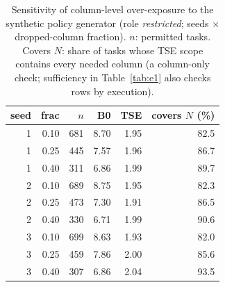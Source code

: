 \begin{table}[t]\centering\caption{Sensitivity of column-level over-exposure to the synthetic policy generator (role \emph{restricted}; seeds $\times$ dropped-column fraction). $n$: permitted tasks. Covers $N$: share of tasks whose TSE scope contains every needed column (a column-only check; sufficiency in Table~\ref{tab:e1} also checks rows by execution).}\label{tab:sens}
\footnotesize\begin{tabular}{rrrrrr}\hline\textbf{seed} & \textbf{frac} & $n$ & \textbf{B0} & \textbf{TSE} & \textbf{covers $N$ (\%)} \\\hline
1 & 0.10 & 681 & 8.70 & 1.95 & 82.5 \\
1 & 0.25 & 445 & 7.57 & 1.96 & 86.7 \\
1 & 0.40 & 311 & 6.86 & 1.99 & 89.7 \\
2 & 0.10 & 689 & 8.75 & 1.95 & 82.3 \\
2 & 0.25 & 473 & 7.30 & 1.91 & 86.5 \\
2 & 0.40 & 330 & 6.71 & 1.99 & 90.6 \\
3 & 0.10 & 699 & 8.63 & 1.93 & 82.0 \\
3 & 0.25 & 459 & 7.86 & 2.00 & 85.6 \\
3 & 0.40 & 307 & 6.86 & 2.04 & 93.5 \\
\hline\end{tabular}\end{table}
